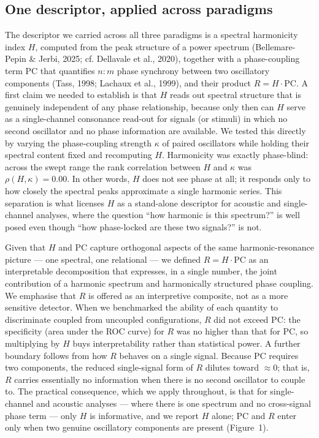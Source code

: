 \documentclass[11pt]{article}
\begin{document}
\subsection{One descriptor, applied across paradigms}
The descriptor we carried across all three paradigms is a spectral harmonicity index $H$, computed from the peak structure of a power spectrum (Bellemare-Pepin \& Jerbi, 2025; cf. Dellavale et al., 2020), together with a phase-coupling term $\mathrm{PC}$ that quantifies $n{:}m$ phase synchrony between two oscillatory components (Tass, 1998; Lachaux et al., 1999), and their product $R=H\cdot\mathrm{PC}$. A first claim we needed to establish is that $H$ reads out spectral structure that is genuinely independent of any phase relationship, because only then can $H$ serve as a single-channel consonance read-out for signals (or stimuli) in which no second oscillator and no phase information are available. We tested this directly by varying the phase-coupling strength $\kappa$ of paired oscillators while holding their spectral content fixed and recomputing $H$. Harmonicity was exactly phase-blind: across the swept range the rank correlation between $H$ and $\kappa$ was $\rho(H,\kappa)=0.00$. In other words, $H$ does not see phase at all; it responds only to how closely the spectral peaks approximate a single harmonic series. This separation is what licenses $H$ as a stand-alone descriptor for acoustic and single-channel analyses, where the question ``how harmonic is this spectrum?'' is well posed even though ``how phase-locked are these two signals?'' is not.

Given that $H$ and $\mathrm{PC}$ capture orthogonal aspects of the same harmonic-resonance picture --- one spectral, one relational --- we defined $R=H\cdot\mathrm{PC}$ as an interpretable decomposition that expresses, in a single number, the joint contribution of a harmonic spectrum and harmonically structured phase coupling. We emphasise that $R$ is offered as an interpretive composite, not as a more sensitive detector. When we benchmarked the ability of each quantity to discriminate coupled from uncoupled configurations, $R$ did not exceed $\mathrm{PC}$: the specificity (area under the ROC curve) for $R$ was no higher than that for $\mathrm{PC}$, so multiplying by $H$ buys interpretability rather than statistical power. A further boundary follows from how $R$ behaves on a single signal. Because $\mathrm{PC}$ requires two components, the reduced single-signal form of $R$ dilutes toward $\approx 0$; that is, $R$ carries essentially no information when there is no second oscillator to couple to. The practical consequence, which we apply throughout, is that for single-channel and acoustic analyses --- where there is one spectrum and no cross-signal phase term --- only $H$ is informative, and we report $H$ alone; $\mathrm{PC}$ and $R$ enter only when two genuine oscillatory components are present (Figure~1).
\end{document}
